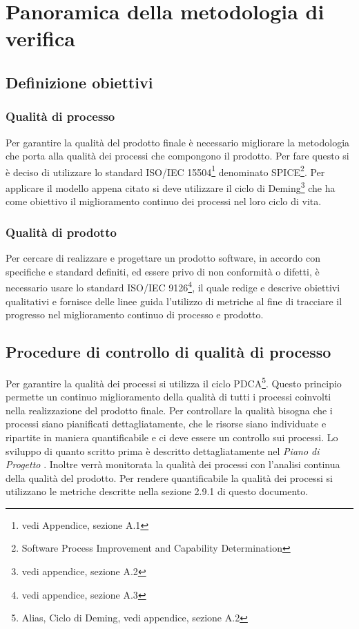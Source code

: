 \newpage
\section{Panoramica della metodologia di verifica}%
\label{2.1}
\subsection{Definizione obiettivi}
\subsubsection{Qualità di processo} %
\label{2.1.1}
Per garantire la qualità del prodotto finale è necessario migliorare la metodologia che porta alla qualità dei processi che compongono il prodotto. Per fare questo si è deciso di utilizzare lo standard ISO/IEC 15504\footnote{vedi Appendice, sezione A.1} denominato SPICE\footnote{Software Process Improvement and Capability Determination}.
Per applicare il modello appena citato si deve utilizzare il ciclo di Deming\footnote{vedi appendice, sezione A.2} che ha come obiettivo il miglioramento continuo dei processi nel loro ciclo di vita.

\subsubsection{Qualità di prodotto} %
\label{2.1.2}
Per cercare di realizzare e progettare un prodotto software, in accordo con specifiche e standard definiti, ed essere privo di non conformità o difetti, è necessario usare lo standard ISO/IEC 9126\footnote{vedi appendice, sezione A.3}, il quale redige e descrive obiettivi qualitativi e fornisce delle linee guida l'utilizzo di metriche al fine di tracciare il progresso nel miglioramento continuo di processo e prodotto.

\subsection{Procedure di controllo di qualità di processo} %
\label{2.2}
Per garantire la qualità dei processi si utilizza il ciclo PDCA\footnote{Alias, Ciclo di Deming, vedi appendice, sezione A.2}.  Questo principio permette un continuo miglioramento della qualità di tutti i processi coinvolti nella realizzazione del prodotto finale.
Per controllare la qualità bisogna che i processi siano pianificati dettagliatamente, che le risorse siano individuate e ripartite in maniera quantificabile e ci deve essere un controllo sui processi. Lo sviluppo di quanto scritto prima è descritto dettagliatamente nel \emph{Piano di Progetto \versionePianoDiProgetto{}}.
Inoltre verrà monitorata la qualità dei processi con l'analisi continua della qualità del prodotto.
Per rendere quantificabile la qualità dei processi si utilizzano le metriche descritte nella sezione 2.9.1 di questo documento.
